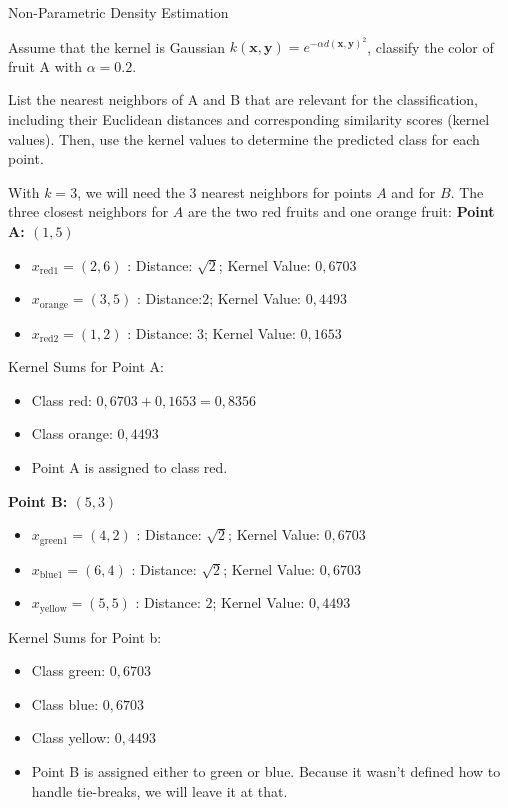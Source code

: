 \documentclass[
	english,
        solution=true
	]{tudaexercise}
\begin{document}
\begin{task}[points=9]{Non-Parametric Density Estimation}
\begin{subtask}[points=7]

Assume that the kernel is Gaussian $k(\boldsymbol{x}, \boldsymbol{y}) = e^{-\alpha d(\boldsymbol{x}, \boldsymbol{y})^2}$, classify the color of fruit A with $\alpha=0.2$. 

List the nearest neighbors of A and B that are relevant for the classification, including their Euclidean distances and corresponding similarity scores (kernel values). Then, use the kernel values to determine the predicted class for each point.

\begin{solution}

With $k=3$, we will need the $3$ nearest neighbors for points $A$ and for $B$. The three closest neighbors for $A$ are the two red fruits and one orange fruit:
\textbf{Point A: $(1, 5)$}
\begin{itemize}
    \item $x_{\text{red}1}=(2, 6)$ : Distance: $\sqrt{2}$; Kernel Value: $0,6703$ 
    \item $x_{\text{orange}}=(3, 5)$ : Distance:$2$; Kernel Value: $0,4493$
    \item $x_{\text{red}2}=(1, 2)$ : Distance: $3$; Kernel Value: $0,1653$
\end{itemize}

Kernel Sums for Point A:
\begin{itemize}
    \item Class red: $0,6703+0,1653=0,8356$
    \item Class orange: $0,4493$
    \item Point A is assigned to class red.
\end{itemize}

\textbf{Point B: $(5, 3)$}
\begin{itemize}
    \item $x_{\text{green}1}=(4, 2)$ : Distance: $\sqrt{2}$; Kernel Value: $0,6703$ 
    \item $x_{\text{blue}1}=(6, 4)$ : Distance: $\sqrt{2}$; Kernel Value: $0,6703$
    \item $x_{\text{yellow}}=(5, 5)$ : Distance: $2$; Kernel Value: $0,4493$
\end{itemize}

Kernel Sums for Point b:
\begin{itemize}
    \item Class green: $0,6703$
    \item Class blue: $0,6703$
    \item Class yellow: $0,4493$
    \item Point B is assigned either to green or blue. Because it wasn't defined how to handle tie-breaks, we will leave it at that.
\end{itemize}


\end{solution}
\end{subtask}
\end{task}
\end{document}
